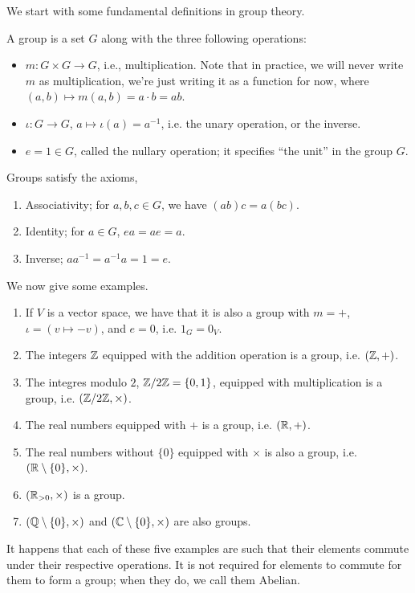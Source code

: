 \newpage
\noindent We start with some fundamental definitions in group theory.
\begin{definition}
    A group is a set $G$ along with the three following operations:
    \begin{itemize}
        \item $m : G \times G \to G$, i.e., multiplication. Note that in practice, we will never write $m$ as multiplication, we're just writing it as a function for now, where $(a, b) \mapsto m(a, b) = a \cdot b = ab$.
        \item $\iota : G \to G$, $a \mapsto \iota(a) = a^{-1}$, i.e. the unary operation, or the inverse.
        \item $e = 1 \in G$, called the nullary operation; it specifies ``the unit'' in the group $G$.
    \end{itemize}
\end{definition}
\noindent Groups satisfy the axioms,
\begin{enumerate}[label=(\alph*)]
    \item Associativity; for $a, b, c \in G$, we have $(ab)c = a(bc)$.
    \item Identity; for $a \in G$, $ea = ae = a$.
    \item Inverse; $a a^{-1} = a^{-1} a = 1 = e$.
\end{enumerate}
We now give some examples.
\begin{enumerate}[label=(\alph*)]
    \item If $V$ is a vector space, we have that it is also a group with $m = +$, $\iota = (v \mapsto -v)$, and $e = 0$, i.e. $1_G = 0_V$.
    \item The integers $\mathbb Z$ equipped with the addition operation is a group, i.e. $(\mathbb Z, +)$.
    \item The integres modulo $2$, $\mathbb Z/2\mathbb Z = \{0, 1\}$, equipped with multiplication is a group, i.e. $(\mathbb Z/2\mathbb Z, \times)$.
    \item The real numbers equipped with $+$ is a group, i.e. $(\mathbb R, +)$.
    \item The real numbers without $\{0\}$ equipped with $\times$ is also a group, i.e. $(\mathbb R \setminus \{0\}, \times)$.
    \item $(\mathbb R_{>0}, \times)$ is a group.
    \item $(\mathbb Q \setminus \{0\}, \times)$ and $(\mathbb C \setminus \{0\}, \times)$ are also groups.
\end{enumerate}
It happens that each of these five examples are such that their elements commute under their respective operations. It is not required for elements to commute for them to form a group; when they do, we call them Abelian.
